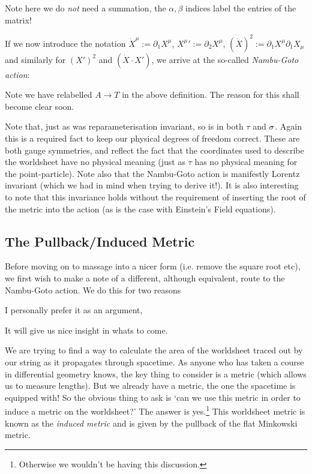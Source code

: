 \br 
Note here we do \textit{not} need a summation, the $\alpha,\beta$ indices label the entries of the matrix!
\er 

If we now introduce the notation $\dot{X}^{\mu} := \partial_1X^{\mu}$, ${X^{\mu}}' := \partial_2X^{\mu}$, $(\dot{X})^2 := \partial_1X^{\mu}\partial_1X_{\mu}$ and similarly for $(X')^2$ and $(\dot{X}\cdot X')$, we arrive at the so-called \textit{Nambu-Goto action}:


\br 
    Note we have relabelled $A\to T$ in the above definition. The reason for this shall become clear soon.
\er 

\br 
    Note that, just as  was reparameterisation invariant, so is  in both $\tau$ and $\sigma$. Again this is a required fact to keep our physical degrees of freedom correct. These are both gauge symmetries, and reflect the fact that the coordinates used to describe the worldsheet have no physical meaning (just as $\tau$ has no physical meaning for the point-particle). Note also that the Nambu-Goto action is manifestly Lorentz invariant (which we had in mind when trying to derive it!). It is also interesting to note that this invariance holds without the requirement of inserting the root of the metric into the action (as is the case with Einstein's Field equations).
\er 

\subsection{The Pullback/Induced Metric}

Before moving on to massage  into a nicer form (i.e. remove the square root etc), we first wish to make a note of a different, although equivalent, route to the Nambu-Goto action. We do this for two reasons
\ben 
    \item I personally prefer it as an argument,
    \item It will give us nice insight in whats to come. 
\een 

We are trying to find a way to calculate the area of the worldsheet traced out by our string as it propagates through spacetime. As anyone who has taken a course in differential geometry knows, the key thing to consider is a metric (which allows us to measure lengths). But we already have a metric, the one the spacetime is equipped with! So the obvious thing to ask is `can we use this metric in order to induce a metric on the worldsheet?' The answer is yes.\footnote{Otherwise we wouldn't be having this discussion.} This worldsheet metric is known as the \textit{induced metric} and is given by the pullback of the flat Minkowski metric. 

